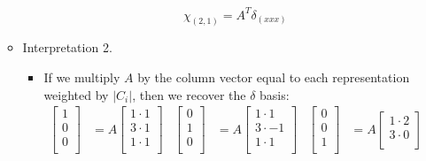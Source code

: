 \documentclass[../notes.tex]{subfiles}
\begin{document}
\begin{itemize}
\begin{itemize}
\begin{itemize}
            \begin{equation*}
                \chi_{(2,1)} = A^T\delta_{(xxx)}
            \end{equation*}
        \end{itemize}
        \item Interpretation 2.
        \begin{itemize}
            \item If we multiply $A$ by the column vector equal to each representation weighted by $|C_i|$, then we recover the $\delta$ basis:
            \begin{align*}
                \begin{bmatrix}
                    1\\
                    0\\
                    0\\
                \end{bmatrix}
                &= A
                \begin{bmatrix}
                    1\cdot 1\\
                    3\cdot 1\\
                    1\cdot 1\\
                \end{bmatrix}&
                \begin{bmatrix}
                    0\\
                    1\\
                    0\\
                \end{bmatrix}
                &= A
                \begin{bmatrix}
                    1\cdot 1\\
                    3\cdot -1\\
                    1\cdot 1\\
                \end{bmatrix}&
                \begin{bmatrix}
                    0\\
                    0\\
                    1\\
                \end{bmatrix}
                &= A
                \begin{bmatrix}
                    1\cdot 2\\
                    3\cdot 0\\

\end{bmatrix}
\end{align*}
\end{itemize}
\end{itemize}
\end{itemize}
\end{document}
